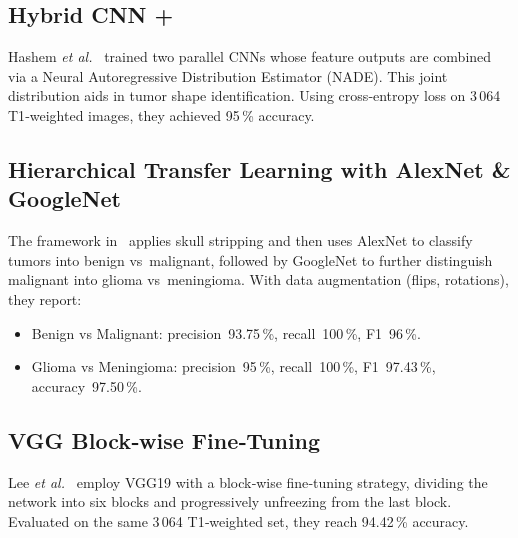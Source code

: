 \subsection{Hybrid CNN + }
Hashem \emph{et al.}~\cite{hashem2020nade} trained two parallel CNNs whose feature outputs are combined via a Neural Autoregressive Distribution Estimator (NADE). This joint distribution aids in tumor shape identification. Using cross‑entropy loss on 3\,064 T1‑weighted images, they achieved 95\,\% accuracy.

\subsection{Hierarchical Transfer Learning with AlexNet \& GoogleNet}
The framework in~\cite{kulkarni2020framework} applies skull stripping and then uses AlexNet to classify tumors into benign vs malignant, followed by GoogleNet to further distinguish malignant into glioma vs meningioma. With data augmentation (flips, rotations), they report:
\begin{itemize}
  \item Benign vs Malignant: precision 93.75\,\%, recall 100\,\%, F1 96\,\%.
  \item Glioma vs Meningioma: precision 95\,\%, recall 100\,\%, F1 97.43\,\%, accuracy 97.50\,\%.
\end{itemize}

\subsection{VGG Block‑wise Fine‑Tuning}
Lee \emph{et al.}~\cite{swati2019transfer} employ VGG19 with a block‑wise fine‑tuning strategy, dividing the network into six blocks and progressively unfreezing from the last block. Evaluated on the same 3\,064 T1‑weighted set, they reach 94.42\,\% accuracy.

